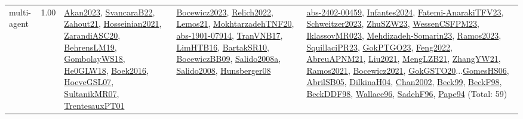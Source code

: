{\begin{longtable}{p{3cm}r>{\raggedright\arraybackslash}p{6cm}>{\raggedright\arraybackslash}p{6cm}>{\raggedright\arraybackslash}p{8cm}}
\index{multi-agent}\index{Concepts!multi-agent}multi-agent &  1.00 & \hyperref[detail:Akan2023]{Akan2023}, \hyperref[detail:SvancaraB22]{SvancaraB22}, \hyperref[detail:Zahout21]{Zahout21}, \hyperref[detail:Hosseinian2021]{Hosseinian2021}, \hyperref[detail:ZarandiASC20]{ZarandiASC20}, \hyperref[detail:BehrensLM19]{BehrensLM19}, \hyperref[detail:GombolayWS18]{GombolayWS18}, \hyperref[detail:He0GLW18]{He0GLW18}, \hyperref[detail:Boek2016]{Boek2016}, \hyperref[detail:HoeveGSL07]{HoeveGSL07}, \hyperref[detail:SultanikMR07]{SultanikMR07}, \hyperref[detail:TrentesauxPT01]{TrentesauxPT01} & \hyperref[detail:Bocewicz2023]{Bocewicz2023}, \hyperref[detail:Relich2022]{Relich2022}, \hyperref[detail:Lemos21]{Lemos21}, \hyperref[detail:MokhtarzadehTNF20]{MokhtarzadehTNF20}, \hyperref[detail:abs-1901-07914]{abs-1901-07914}, \hyperref[detail:TranVNB17]{TranVNB17}, \hyperref[detail:LimHTB16]{LimHTB16}, \hyperref[detail:BartakSR10]{BartakSR10}, \hyperref[detail:BocewiczBB09]{BocewiczBB09}, \hyperref[detail:Salido2008a]{Salido2008a}, \hyperref[detail:Salido2008]{Salido2008}, \hyperref[detail:Hunsberger08]{Hunsberger08} & \hyperref[detail:abs-2402-00459]{abs-2402-00459}, \hyperref[detail:Infantes2024]{Infantes2024}, \hyperref[detail:Fatemi-AnarakiTFV23]{Fatemi-AnarakiTFV23}, \hyperref[detail:Schweitzer2023]{Schweitzer2023}, \hyperref[detail:ZhuSZW23]{ZhuSZW23}, \hyperref[detail:WessenCSFPM23]{WessenCSFPM23}, \hyperref[detail:IklassovMR023]{IklassovMR023}, \hyperref[detail:Mehdizadeh-Somarin23]{Mehdizadeh-Somarin23}, \hyperref[detail:Ramos2023]{Ramos2023}, \hyperref[detail:SquillaciPR23]{SquillaciPR23}, \hyperref[detail:GokPTGO23]{GokPTGO23}, \hyperref[detail:Feng2022]{Feng2022}, \hyperref[detail:AbreuAPNM21]{AbreuAPNM21}, \hyperref[detail:Liu2021]{Liu2021}, \hyperref[detail:MengLZB21]{MengLZB21}, \hyperref[detail:ZhangYW21]{ZhangYW21}, \hyperref[detail:Ramos2021]{Ramos2021}, \hyperref[detail:Bocewicz2021]{Bocewicz2021}, \hyperref[detail:GokGSTO20]{GokGSTO20}...\hyperref[detail:GomesHS06]{GomesHS06}, \hyperref[detail:AbrilSB05]{AbrilSB05}, \hyperref[detail:DilkinaH04]{DilkinaH04}, \hyperref[detail:Chan2002]{Chan2002}, \hyperref[detail:Beck99]{Beck99}, \hyperref[detail:BeckF98]{BeckF98}, \hyperref[detail:BeckDDF98]{BeckDDF98}, \hyperref[detail:Wallace96]{Wallace96}, \hyperref[detail:SadehF96]{SadehF96}, \hyperref[detail:Pape94]{Pape94} (Total: 59)\\

\end{longtable}}

